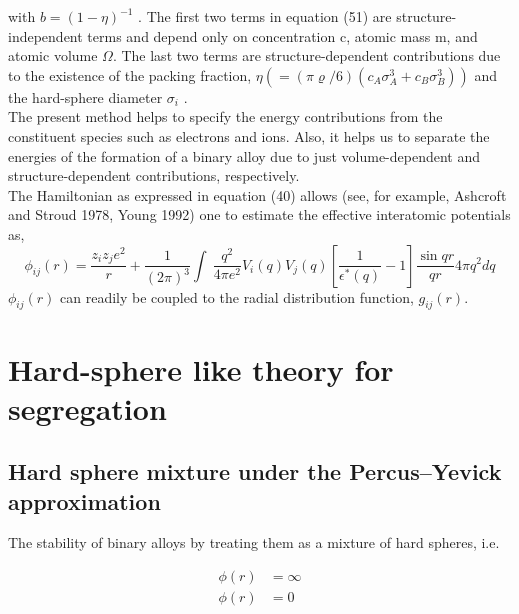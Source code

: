 \documentclass[12pt]{article}
\newcommand*{\1}{\hspace{1pt}}
\begin{document}
    with $b = (1 - \eta)^{-1}$ . The first two terms in equation (51) are structure-independent terms and 
    depend only on concentration c, atomic mass m, and atomic volume $\Omega $. The last two terms are 
    structure-dependent contributions due to the existence of the packing
    fraction, $\eta (= (\pi \varrho/6)(c_A\sigma^3_A + c_B\sigma^3_{B})) $ and the hard-sphere diameter $\sigma _{i}$ .\\
        The present method helps to specify the energy contributions from the constituent
    species such as electrons and ions. Also, it helps us to separate the energies of the formation
    of a binary alloy due to just volume-dependent and structure-dependent contributions,
    respectively.\\
    The Hamiltonian as expressed in equation (40) allows (see, for example, Ashcroft and Stroud 1978, Young
    1992) one to estimate the effective interatomic potentials as,
        \begin{equation}
            \phi _{ij}(r) = \frac{z_{i}z_{j}e^2}{r} + \frac{1}{(2\pi)^3}\int_{}^{}  \,\frac{q^2}{4\pi e^2}V_{i}(q)V_{j}(q)
            \left[\frac{1}{\epsilon ^{\ast}(q) } - 1\right]\frac{\sin qr}{qr} 4\pi q^2 dq 
        \end{equation}
    $\phi _{ij}(r)$ can readily be coupled to the radial distribution function, $g_{ij}(r)$.\\

    \section{ Hard-sphere like theory for segregation}

    \subsection{ Hard sphere mixture under the Percus–Yevick approximation}

    The stability of binary alloys by treating them as a mixture of hard spheres, i.e.

    \begin{align}
        \phi (r)& = \infty \tag{for $r<0$} \\
        \phi (r)& = 0  \tag{for $r>0$} \\
    \end{align}
\end{document}
